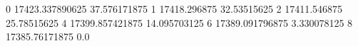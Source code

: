 0 17423.337890625 37.576171875
1 17418.296875 32.53515625
2 17411.546875 25.78515625
4 17399.857421875 14.095703125
6 17389.091796875 3.330078125
8 17385.76171875 0.0
